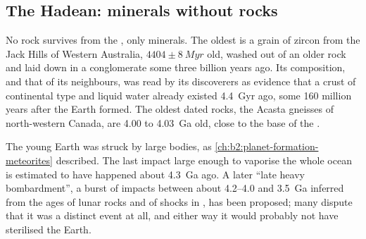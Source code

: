 \begin{omfigure}
\par{}
\end{omfigure}

\subsection*{The Hadean: minerals without rocks}

No rock survives from the , only minerals. The oldest is a grain of zircon from the Jack
Hills of Western Australia, $4404 \pm \qty{8}{Myr}$ old, washed out of an older rock and laid
down in a conglomerate some three billion years ago. Its composition, and that of its
neighbours, was read by its discoverers as evidence that a crust of continental type and
liquid water already existed \qty{4.4}{Gyr} ago, some 160 million years after the Earth
formed. The oldest dated rocks, the Acasta gneisses of north-western Canada, are 4.00 to
\qty{4.03}{Ga} old, close to the base of the .

The young Earth was struck by large bodies, as \cref{ch:b2:planet-formation-meteorites}
described. The last impact large enough to vaporise
the whole ocean is estimated to have happened about \qty{4.3}{Ga} ago. A later ``late heavy
bombardment'', a burst of impacts between about 4.2--4.0 and \qty{3.5}{Ga} inferred from the
ages of lunar rocks and of shocks in , has been proposed; many dispute that it was a
distinct event at all, and either way it would probably not have sterilised the Earth.

